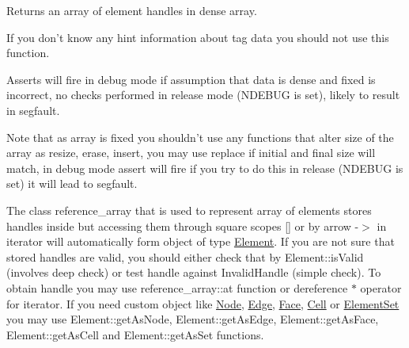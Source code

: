 Returns an array of element handles in dense array. 

If you don't know any hint information about tag data you should not use this function.

Asserts will fire in debug mode if assumption that data is dense and fixed is incorrect, no checks performed in release mode (N\-D\-E\-B\-U\-G is set), likely to result in segfault.

Note that as array is fixed you shouldn't use any functions that alter size of the array as resize, erase, insert, you may use replace if initial and final size will match, in debug mode assert will fire if you try to do this in release (N\-D\-E\-B\-U\-G is set) it will lead to segfault.

The class reference\-\_\-array that is used to represent array of elements stores handles inside but accessing them through square scopes \mbox{[}\mbox{]} or by arrow -\/$>$ in iterator will automatically form object of type \hyperlink{classINMOST_1_1Element}{Element}. If you are not sure that stored handles are valid, you should either check that by Element\-::is\-Valid (involves deep check) or test handle against Invalid\-Handle (simple check). To obtain handle you may use reference\-\_\-array\-::at function or dereference $\ast$ operator for iterator. If you need custom object like \hyperlink{classINMOST_1_1Node}{Node}, \hyperlink{classINMOST_1_1Edge}{Edge}, \hyperlink{classINMOST_1_1Face}{Face}, \hyperlink{classINMOST_1_1Cell}{Cell} or \hyperlink{classINMOST_1_1ElementSet}{Element\-Set} you may use Element\-::get\-As\-Node, Element\-::get\-As\-Edge, Element\-::get\-As\-Face, Element\-::get\-As\-Cell and Element\-::get\-As\-Set functions.


